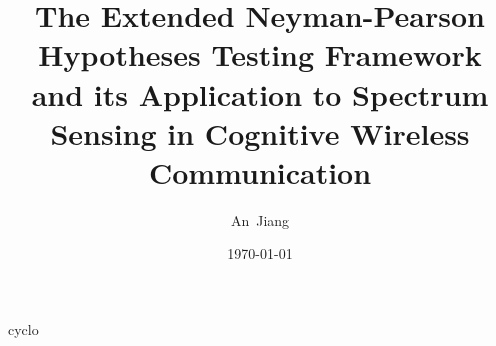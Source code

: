 \documentclass{report}
\author{An~Jiang}
\title{The Extended Neyman-Pearson Hypotheses Testing Framework and its Application to Spectrum Sensing in Cognitive Wireless Communication}
\date{\today}
\begin{document}
\begin{spacing}{2.0}
\maketitle
{cyclo}

\newpage
\end{spacing}
\end{document}
